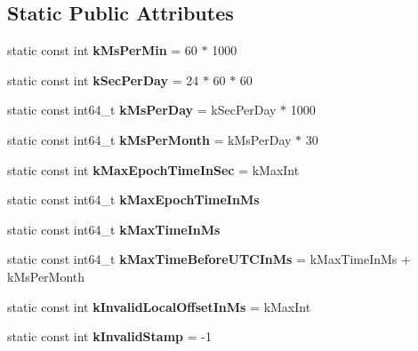 \subsection*{Static Public Attributes}
\begin{DoxyCompactItemize}
\item 
static const int {\bfseries k\+Ms\+Per\+Min} = 60 $\ast$ 1000\hypertarget{classv8_1_1internal_1_1_date_cache_a3c761028d118de4a4d1e48b61cf4d349}{}\label{classv8_1_1internal_1_1_date_cache_a3c761028d118de4a4d1e48b61cf4d349}

\item 
static const int {\bfseries k\+Sec\+Per\+Day} = 24 $\ast$ 60 $\ast$ 60\hypertarget{classv8_1_1internal_1_1_date_cache_a79dad318641797f0763f3ec7c29f206f}{}\label{classv8_1_1internal_1_1_date_cache_a79dad318641797f0763f3ec7c29f206f}

\item 
static const int64\+\_\+t {\bfseries k\+Ms\+Per\+Day} = k\+Sec\+Per\+Day $\ast$ 1000\hypertarget{classv8_1_1internal_1_1_date_cache_aba1f60dee0b7f7d1b7e0b99323e6d613}{}\label{classv8_1_1internal_1_1_date_cache_aba1f60dee0b7f7d1b7e0b99323e6d613}

\item 
static const int64\+\_\+t {\bfseries k\+Ms\+Per\+Month} = k\+Ms\+Per\+Day $\ast$ 30\hypertarget{classv8_1_1internal_1_1_date_cache_a7b74095e6e7cae1dcef2023a067ca25a}{}\label{classv8_1_1internal_1_1_date_cache_a7b74095e6e7cae1dcef2023a067ca25a}

\item 
static const int {\bfseries k\+Max\+Epoch\+Time\+In\+Sec} = k\+Max\+Int\hypertarget{classv8_1_1internal_1_1_date_cache_a9b0e9e5f19fd9e849462123954e0557d}{}\label{classv8_1_1internal_1_1_date_cache_a9b0e9e5f19fd9e849462123954e0557d}

\item 
static const int64\+\_\+t {\bfseries k\+Max\+Epoch\+Time\+In\+Ms}
\item 
static const int64\+\_\+t {\bfseries k\+Max\+Time\+In\+Ms}
\item 
static const int64\+\_\+t {\bfseries k\+Max\+Time\+Before\+U\+T\+C\+In\+Ms} = k\+Max\+Time\+In\+Ms + k\+Ms\+Per\+Month\hypertarget{classv8_1_1internal_1_1_date_cache_aeda61b9cbafe90e99870516c0ce10bcc}{}\label{classv8_1_1internal_1_1_date_cache_aeda61b9cbafe90e99870516c0ce10bcc}

\item 
static const int {\bfseries k\+Invalid\+Local\+Offset\+In\+Ms} = k\+Max\+Int\hypertarget{classv8_1_1internal_1_1_date_cache_ab1f3dcb4895b2e277589cce9d025c104}{}\label{classv8_1_1internal_1_1_date_cache_ab1f3dcb4895b2e277589cce9d025c104}

\item 
static const int {\bfseries k\+Invalid\+Stamp} = -\/1\hypertarget{classv8_1_1internal_1_1_date_cache_a672aa540aa45bd02ac9eea74a1536841}{}\label{classv8_1_1internal_1_1_date_cache_a672aa540aa45bd02ac9eea74a1536841}

\end{DoxyCompactItemize}
